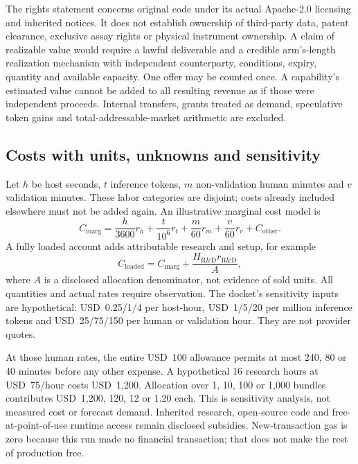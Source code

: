 \documentclass[11pt,letterpaper]{article}
\theoremstyle{definition}\newtheorem{definition}[theorem]{Definition}
\theoremstyle{remark}\newtheorem{remark}[theorem]{Remark}
\begin{document}
The rights statement concerns original code under its actual Apache-2.0 licensing and inherited notices. It does not establish ownership of third-party data, patent clearance, exclusive assay rights or physical instrument ownership. A claim of realizable value would require a lawful deliverable and a credible arm's-length realization mechanism with independent counterparty, conditions, expiry, quantity and available capacity. One offer may be counted once. A capability's estimated value cannot be added to all resulting revenue as if those were independent proceeds. Internal transfers, grants treated as demand, speculative token gains and total-addressable-market arithmetic are excluded.

\subsection{Costs with units, unknowns and sensitivity}
Let \(h\) be host seconds, \(t\) inference tokens, \(m\) non-validation human minutes and \(v\) validation minutes. These labor categories are disjoint; costs already included elsewhere must not be added again. An illustrative marginal cost model is
\begin{equation}
 C_{\mathrm{marg}}
 =\frac{h}{3600}r_h+\frac{t}{10^6}r_t
  +\frac{m}{60}r_m+\frac{v}{60}r_v+C_{\mathrm{other}} .
 \label{eq:cost}
\end{equation}
A fully loaded account adds attributable research and setup, for example
\[
 C_{\mathrm{loaded}}=C_{\mathrm{marg}}+\frac{H_{\mathrm{R\&D}}r_{\mathrm{R\&D}}}{A},
\]
where \(A\) is a disclosed allocation denominator, not evidence of sold units. All quantities and actual rates require observation. The docket's sensitivity inputs are hypothetical: USD~0.25/1/4 per host-hour, USD~1/5/20 per million inference tokens and USD~25/75/150 per human or validation hour. They are not provider quotes.

At those human rates, the entire USD~100 allowance permits at most 240, 80 or 40 minutes before any other expense. A hypothetical 16 research hours at USD~75/hour costs USD~1,200. Allocation over 1, 10, 100 or 1,000 bundles contributes USD~1,200, 120, 12 or 1.20 each. This is sensitivity analysis, not measured cost or forecast demand. Inherited research, open-source code and free-at-point-of-use runtime access remain disclosed subsidies. New-transaction gas is zero because this run made no financial transaction; that does not make the rest of production free.
\end{document}
